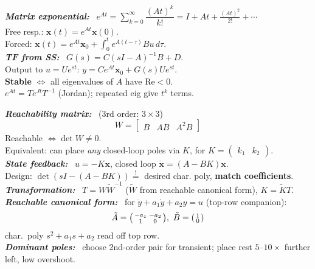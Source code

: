 \documentclass[9pt]{extarticle}
\newcommand{\sect}[1]{%
  \vspace{2pt}\par\noindent
  \colorbox{hdrbg}{\makebox[\dimexpr\linewidth-2\fboxsep][l]{%
    \textbf{\footnotesize\textcolor{hdr}{#1}}}}%
  \par\vspace{1.5pt}}
\newcommand{\sub}[1]{\textit{\textbf{#1:}}\ }
\begin{document}
\begin{multicols}{3}
\sect{9. State-Space Response (Lec 6)}
\sub{Matrix exponential} $e^{At}=\sum_{k=0}^{\infty}\dfrac{(At)^k}{k!}=I+At+\tfrac{(At)^2}{2!}+\cdots$\\
Free resp.: $\mathbf x(t)=e^{At}\mathbf x(0)$.\\
Forced: $\mathbf x(t)=e^{At}\mathbf x_0+\int_0^t e^{A(t-\tau)}Bu\,d\tau$.\\
\sub{TF from SS} $G(s)=C(sI-A)^{-1}B+D$.\\
Output to $u=Ue^{st}$: $y=Ce^{At}\mathbf x_0+G(s)Ue^{st}$.\\
\textbf{Stable} $\Leftrightarrow$ all eigenvalues of $A$ have $\mathrm{Re}<0$.\\
$e^{At}=Te^{Jt}T^{-1}$ (Jordan); repeated eig give $t^k$ terms.

\sect{10. Reachability / Control (Lec 7)}
\sub{Reachability matrix} (3rd order: $3\times3$)
\[ W=\begin{bmatrix}B&AB&A^2B\end{bmatrix} \]
Reachable $\Leftrightarrow \det W\neq0$.\\
Equivalent: can place \emph{any} closed-loop poles via $K$, for $K=\begin{pmatrix}k_1&k_2\end{pmatrix}$.\\
\sub{State feedback} $u=-K\mathbf x$, closed loop $\dot{\mathbf x}=(A-BK)\mathbf x$.\\
Design: $\det(sI-(A-BK))\overset{!}{=}$ desired char. poly, \textbf{match coefficients}.\\
\sub{Transformation} $T=W\tilde W^{-1}$ ($\tilde W$ from reachable canonical form), $K=\tilde K T$.\\
\sub{Reachable canonical form} for $\ddot y{+}a_1\dot y{+}a_2y{=}u$ (top-row companion):
\[ \tilde A=\begin{psmallmatrix}-a_1&-a_2\\1&0\end{psmallmatrix},\ \tilde B=\begin{psmallmatrix}1\\0\end{psmallmatrix} \]
char.\ poly $s^2{+}a_1s{+}a_2$ read off top row.\\
\sub{Dominant poles} choose 2nd-order pair for transient; place rest $5$--$10\times$ further left, low overshoot.


\end{multicols}
\end{document}
